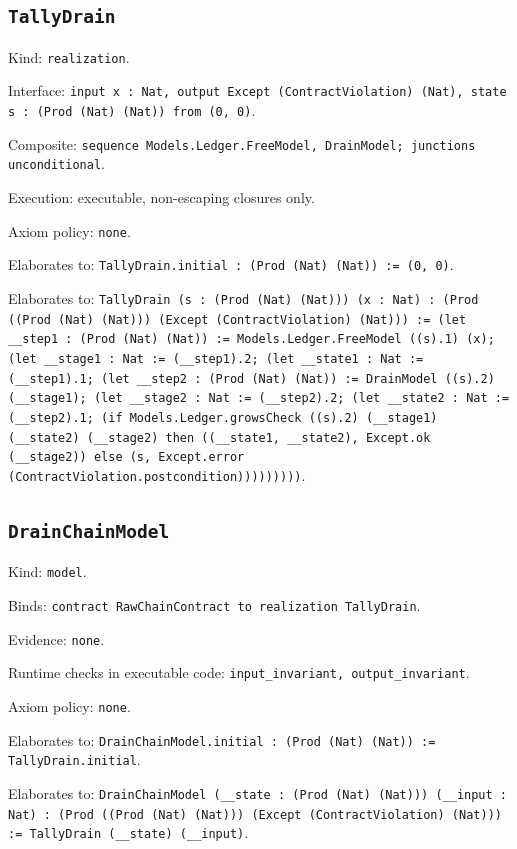 \documentclass[11pt]{article}
\begin{document}
\subsection*{\texttt{TallyDrain}}
\noindent Kind: \texttt{realization}.\par
\noindent Interface: \texttt{input x : Nat, output Except (ContractViolation) (Nat), state s : (Prod (Nat) (Nat)) from (0, 0)}.\par
\noindent Composite: \texttt{sequence Models.Ledger.FreeModel, DrainModel; junctions unconditional}.\par
\noindent Execution: executable, non-escaping closures only.\par
\noindent Axiom policy: \texttt{none}.\par
\noindent Elaborates to: \texttt{TallyDrain.initial : (Prod (Nat) (Nat)) := (0, 0)}.\par
\noindent Elaborates to: \texttt{TallyDrain (s : (Prod (Nat) (Nat))) (x : Nat) : (Prod ((Prod (Nat) (Nat))) (Except (ContractViolation) (Nat))) := (let \_\_step1 : (Prod (Nat) (Nat)) := Models.Ledger.FreeModel ((s).1) (x); (let \_\_stage1 : Nat := (\_\_step1).2; (let \_\_state1 : Nat := (\_\_step1).1; (let \_\_step2 : (Prod (Nat) (Nat)) := DrainModel ((s).2) (\_\_stage1); (let \_\_stage2 : Nat := (\_\_step2).2; (let \_\_state2 : Nat := (\_\_step2).1; (if Models.Ledger.growsCheck ((s).2) (\_\_stage1) (\_\_state2) (\_\_stage2) then ((\_\_state1, \_\_state2), Except.ok (\_\_stage2)) else (s, Except.error (ContractViolation.postcondition)))))))))}.\par
\subsection*{\texttt{DrainChainModel}}
\noindent Kind: \texttt{model}.\par
\noindent Binds: \texttt{contract RawChainContract to realization TallyDrain}.\par
\noindent Evidence: \texttt{none}.\par
\noindent Runtime checks in executable code: \texttt{input\_invariant, output\_invariant}.\par
\noindent Axiom policy: \texttt{none}.\par
\noindent Elaborates to: \texttt{DrainChainModel.initial : (Prod (Nat) (Nat)) := TallyDrain.initial}.\par
\noindent Elaborates to: \texttt{DrainChainModel (\_\_state : (Prod (Nat) (Nat))) (\_\_input : Nat) : (Prod ((Prod (Nat) (Nat))) (Except (ContractViolation) (Nat))) := TallyDrain (\_\_state) (\_\_input)}.\par
\end{document}
